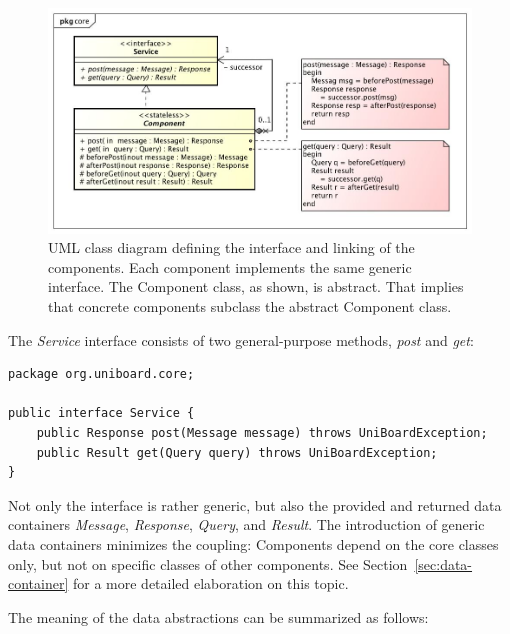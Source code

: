 \documentclass[oneside]{scrreprt}
\begin{document}
\begin{figure}[ht]
\centerline{
\includegraphics[width=1.0\textwidth]{figs/chain-of-components}}
\caption{UML class diagram defining the interface and linking
of the components. Each component implements the same generic
interface. The Component class, as shown, is abstract. That
implies that concrete components subclass the abstract
Component class.}
\label{fig:chain-of-components}
\end{figure}

The \emph{Service} interface consists of two
general-purpose methods, \emph{post} and \emph{get}:

\begin{lstlisting}
package org.uniboard.core;

public interface Service {
    public Response post(Message message) throws UniBoardException;
    public Result get(Query query) throws UniBoardException;
}
\end{lstlisting}

Not only the interface is rather generic, but also the provided
and returned data containers \emph{Message}, \emph{Response},
\emph{Query}, and \emph{Result}. The introduction of generic
data containers minimizes the coupling: Components depend on
the core classes only, but not on specific classes of other
components. See Section~\ref{sec:data-container} for
a more detailed elaboration on this topic.

The meaning of the data abstractions can be summarized as follows:
\end{document}
